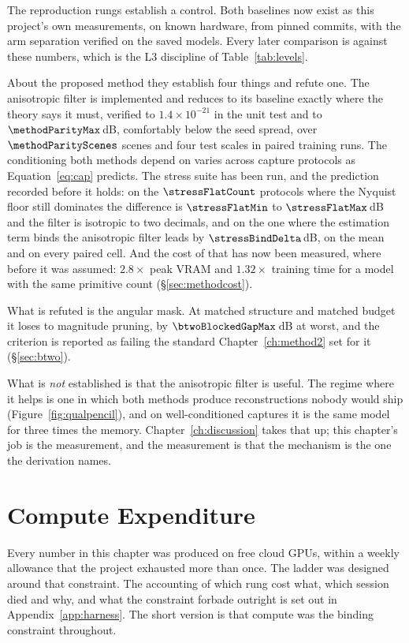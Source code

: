 The reproduction rungs establish a control. Both baselines now exist as this project's own
measurements, on known hardware, from pinned commits, with the arm separation verified on the saved models. Every later comparison is against these numbers, which is
the L3 discipline of Table~\ref{tab:levels}.

About the proposed method they establish four things and refute one. The anisotropic filter is
implemented and reduces to its baseline exactly where the theory says it must,
verified to $1.4\times10^{-21}$ in the unit test and to $\methodParityMax$\,dB, comfortably below the seed spread, over
$\methodParityScenes$ scenes and four test scales in paired training runs. The conditioning both methods depend on
varies across capture protocols as Equation~\eqref{eq:cap} predicts.
The stress suite has been run, and the prediction recorded before it holds: on
the $\stressFlatCount$ protocols where the Nyquist floor still dominates the
difference is $\stressFlatMin$ to $\stressFlatMax$\,dB and the filter is
isotropic to two decimals, and on the one where the estimation term binds the anisotropic filter
leads by $\stressBindDelta$\,dB, on the mean and on every paired cell. And the cost of that has now been measured, where before it was assumed: $2.8\times$ peak VRAM and
$1.32\times$ training time for a model with the same primitive count
(\S\ref{sec:methodcost}).

What is refuted is the angular mask. At matched structure and matched budget it loses to
magnitude pruning, by $\btwoBlockedGapMax$\,dB at worst, and the criterion is
reported as failing the standard Chapter~\ref{ch:method2} set for it
(\S\ref{sec:btwo}).

What is \emph{not} established is that the anisotropic filter is useful. The regime where it helps
is one in which both methods produce reconstructions nobody would ship
(Figure~\ref{fig:qualpencil}), and on well-conditioned captures it is the same
model for three times the memory. Chapter~\ref{ch:discussion} takes that up;
this chapter's job is the measurement, and the measurement is that the mechanism
is the one the derivation names.

\section{Compute Expenditure}
\label{sec:budget}

Every number in this chapter was produced on free cloud GPUs, within a weekly
allowance that the project exhausted more than once. The ladder was designed around that constraint. The accounting of which rung
cost what, which session died and why, and what the constraint forbade outright
is set out in Appendix~\ref{app:harness}. The short version is that compute was the binding constraint throughout.